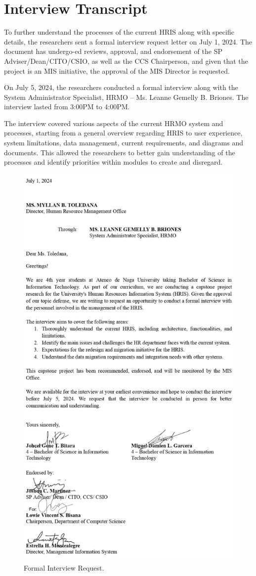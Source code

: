 \chapter{Interview Transcript}

To further understand the processes of the current HRIS along with specific details, the researchers sent a formal interview request letter on July 1, 2024. The document has undergo-ed reviews, approval, and endorsement of the SP Adviser/Dean/CITO/CSIO, as well as the CCS Chairperson, and given that the project is an MIS initiative, the approval of the MIS Director is requested.

On July 5, 2024, the researchers conducted a formal interview along with the System Administrator Specialist, HRMO -- Ms. Leanne Gemelly B. Briones. The interview lasted from 3:00PM to 4:00PM.

The interview covered various aspects of the current HRMO system and processes, starting from a general overview regarding HRIS to user experience, system limitations, data management, current requirements, and diagrams and documents. This allowed the researchers to better gain understanding of the processes and identify priorities within modules to create and disregard.

\begin{figure}[H]
    \centering
    \includegraphics[width=.78\linewidth]{figures/misc/fig-interview-letter-request.jpg}
    \caption{Formal Interview Request.}
    \label{fig:enter-label}
\end{figure}

